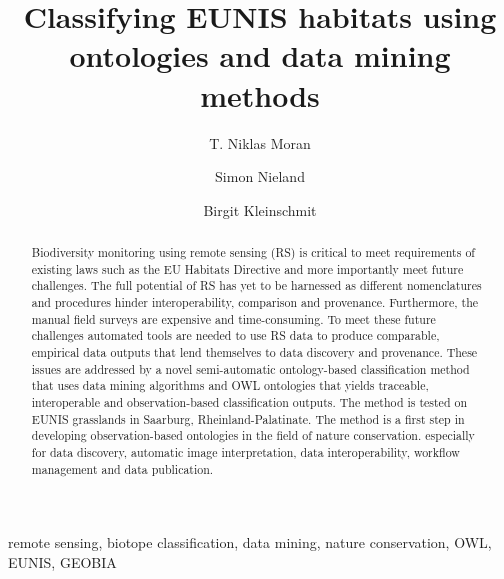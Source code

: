 \documentclass[authoryear,review,12pt,number]{elsarticle}
\begin{document}
%
\begin{frontmatter}
\title{Classifying EUNIS habitats using ontologies and data mining 
methods}

\author[TUB]{T. Niklas Moran}

\author[TUB]{Simon Nieland}
\author[TUB]{Birgit Kleinschmit}

\address[TUB]{Geoinformation in Environmental Planning Lab, Technische
Universit\"at Berlin, Stra\ss e des 17. Juni 145, 10623 Berlin, Germany}


\begin{abstract}
Biodiversity monitoring using remote sensing (RS) is critical to meet 
requirements of existing laws such as the EU Habitats Directive and more 
importantly meet future challenges. The full potential of RS has yet to be 
harnessed as different nomenclatures and procedures hinder interoperability, 
comparison and provenance. Furthermore, the manual field surveys are expensive 
and time-consuming. To meet these future challenges automated tools are needed 
to use RS data to produce comparable, empirical data outputs that lend 
themselves to data discovery and provenance. These issues are addressed by a 
novel semi-automatic ontology-based classification method that uses data mining 
algorithms and OWL ontologies that yields traceable, interoperable and 
observation-based classification outputs. The method is tested on EUNIS 
grasslands in Saarburg, Rheinland-Palatinate. The method is a first step in 
developing observation-based ontologies in the field of nature conservation. 
especially for data discovery, automatic image interpretation, data 
interoperability, workflow management and data publication.
\end{abstract}

\begin{keyword}
remote sensing, biotope classification, data mining, nature conservation, OWL, 
EUNIS, GEOBIA 
\end{keyword}
\end{frontmatter}
\end{document}
